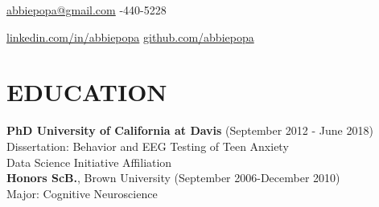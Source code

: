 \documentclass[line,margin,10pt]{res}
\begin{document}
 
\begin{resume}
\hoffset\centerline 
{\hyperref[abbiepopa@gmail.com]{abbiepopa@gmail.com} \quad \quad \quad \quad  \quad \quad \quad \quad \quad \quad \quad \quad \quad \quad \quad \quad \quad \quad \quad \quad \quad\quad \quad \quad \quad \quad \quad \quad \quad \quad \quad \quad  \quad \quad {}-440-5228}
\hoffset\centerline 
{\hspace{0.05cm} \hyperref[linkedin.com/in/abbiepopa]{linkedin.com/in/abbiepopa} \quad \quad \quad \quad \quad \quad \quad \quad \quad \quad \quad\quad \quad \quad \quad \quad \quad \quad \quad \quad \quad \quad  \quad \quad \quad  \quad \quad \quad   \quad \hyperref[github.com/abbiepopa]{github.com/abbiepopa}}
 
\section{EDUCATION} 
\textbf{PhD University of California at Davis} \hfill (September 2012 - June 2018)\\
Dissertation: Behavior and EEG Testing of Teen Anxiety\\
Data Science Initiative Affiliation\\
\textbf{Honors ScB.}, Brown University \hfill (September 2006-December 2010)\\
                Major: Cognitive Neuroscience



\end{resume}
\end{document}
